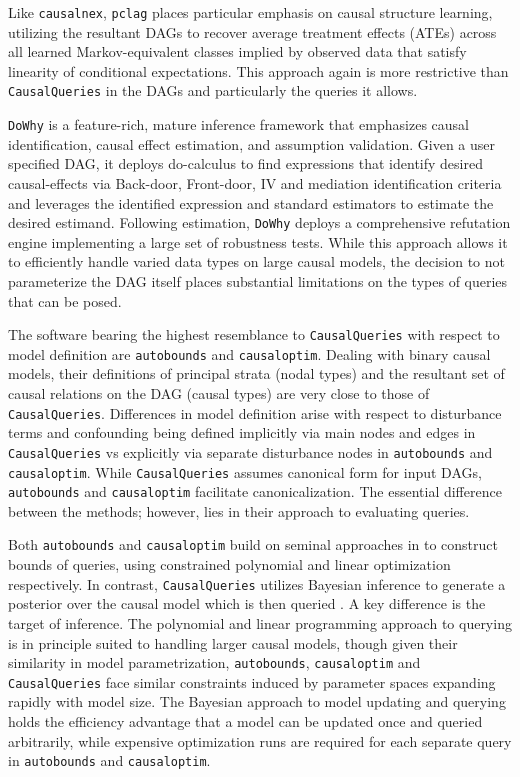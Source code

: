 \documentclass[
  11pt,
  article]{jss}
\begin{document}
Like \texttt{causalnex}, \texttt{pclag} places particular emphasis on
causal structure learning, utilizing the resultant DAGs to recover
average treatment effects (ATEs) across all learned Markov-equivalent
classes implied by observed data that satisfy linearity of conditional
expectations. This approach again is more restrictive than
\texttt{CausalQueries} in the DAGs and particularly the queries it
allows.

\texttt{DoWhy} is a feature-rich, mature inference framework that
emphasizes causal identification, causal effect estimation, and
assumption validation. Given a user specified DAG, it deploys
do-calculus to find expressions that identify desired causal-effects via
Back-door, Front-door, IV and mediation identification criteria and
leverages the identified expression and standard estimators to estimate
the desired estimand. Following estimation, \texttt{DoWhy} deploys a
comprehensive refutation engine implementing a large set of robustness
tests. While this approach allows it to efficiently handle varied data
types on large causal models, the decision to not parameterize the DAG
itself places substantial limitations on the types of queries that can
be posed.

The software bearing the highest resemblance to \texttt{CausalQueries}
with respect to model definition are \texttt{autobounds} and
\texttt{causaloptim}. Dealing with binary causal models, their
definitions of principal strata (nodal types) and the resultant set of
causal relations on the DAG (causal types) are very close to those of
\texttt{CausalQueries}. Differences in model definition arise with
respect to disturbance terms and confounding being defined implicitly
via main nodes and edges in \texttt{CausalQueries} vs explicitly via
separate disturbance nodes in \texttt{autobounds} and
\texttt{causaloptim}. While \texttt{CausalQueries} assumes canonical
form for input DAGs, \texttt{autobounds} and \texttt{causaloptim}
facilitate canonicalization. The essential difference between the
methods; however, lies in their approach to evaluating queries.

Both \texttt{autobounds} and \texttt{causaloptim} build on seminal
approaches in \citet{balke_bounds_1997} to construct bounds of queries,
using constrained polynomial and linear optimization respectively. In
contrast, \texttt{CausalQueries} utilizes Bayesian inference to generate
a posterior over the causal model which is then queried
\citep[consistent
with][]{chickering_clinicians_1996, zhang_partial_2022}. A key
difference is the target of inference. The polynomial and linear
programming approach to querying is in principle suited to handling
larger causal models, though given their similarity in model
parametrization, \texttt{autobounds}, \texttt{causaloptim} and
\texttt{CausalQueries} face similar constraints induced by parameter
spaces expanding rapidly with model size. The Bayesian approach to model
updating and querying holds the efficiency advantage that a model can be
updated once and queried arbitrarily, while expensive optimization runs
are required for each separate query in \texttt{autobounds} and
\texttt{causaloptim}.
\end{document}
